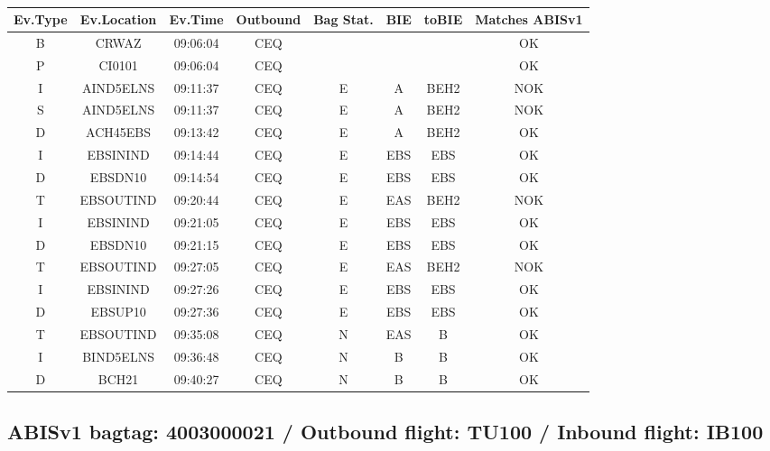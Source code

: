 \documentclass{report}
\begin{document}
\paragraph{}
\begin{longtable}{cccccccc}    \toprule
\rowcolor{white!50}
\textbf{Ev.Type} & \textbf{Ev.Location} & \textbf{Ev.Time} & \textbf{Outbound} & \textbf{Bag Stat.} & \textbf{BIE} & \textbf{toBIE} & \textbf{Matches ABISv1} \\\midrule
B & CRWAZ & 09:06:04  & CEQ &  &  &  & OK\\
P & CI0101 & 09:06:04  & CEQ &  &  &  & OK\\
I & AIND5ELNS & 09:11:37  & CEQ & E & A & BEH2 & NOK\\
S & AIND5ELNS & 09:11:37  & CEQ & E & A & BEH2 & NOK\\
D & ACH45EBS & 09:13:42  & CEQ & E & A & BEH2 & OK\\
I & EBSININD & 09:14:44  & CEQ & E & EBS & EBS & OK\\
D & EBSDN10 & 09:14:54  & CEQ & E & EBS & EBS & OK\\
T & EBSOUTIND & 09:20:44  & CEQ & E & EAS & BEH2 & NOK\\
I & EBSININD & 09:21:05  & CEQ & E & EBS & EBS & OK\\
D & EBSDN10 & 09:21:15  & CEQ & E & EBS & EBS & OK\\
T & EBSOUTIND & 09:27:05  & CEQ & E & EAS & BEH2 & NOK\\
I & EBSININD & 09:27:26  & CEQ & E & EBS & EBS & OK\\
D & EBSUP10 & 09:27:36  & CEQ & E & EBS & EBS & OK\\
T & EBSOUTIND & 09:35:08  & CEQ & N & EAS & B & OK\\
I & BIND5ELNS & 09:36:48  & CEQ & N & B & B & OK\\
D & BCH21 & 09:40:27  & CEQ & N & B & B & OK\\
\bottomrule
\end{longtable}
\subsection*{ABISv1 bagtag: 4003000021 / Outbound flight: TU100 / Inbound flight: IB100}
\end{document}
